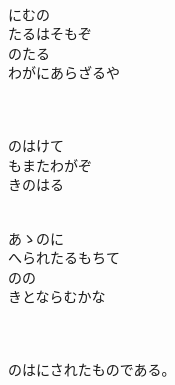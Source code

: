 \documentclass[10pt,b5j]{tarticle} %
\begin{document}
\begin{enumerate}
\begin{minipage}[c]{\blocksize}
        \vspace{\linespace}
        \item~\\
        にむの\\
        たるはそもぞ\\
        のたる\\
        わがにあらざるや
        
        \vspace{\linespace}
        \item~\\
        \\
        のはけて\\
        もまたわがぞ\\
        きのはる
        
        \vspace{\linespace}
        \item~\\
        あゝのに\\
        へられたるもちて\\
        のの\\
        きとならむかな
        
        \vspace{\linespace}
        \item~\\
        \\
        のはにされたものである。
    
    \end{minipage}
\end{enumerate} %
\end{document}
